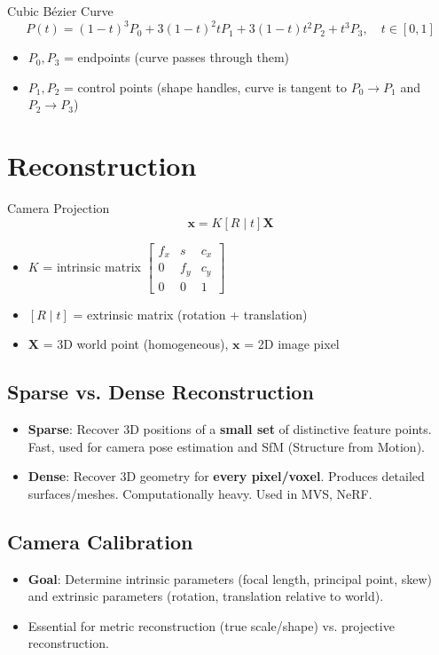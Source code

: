 \documentclass[11pt]{article}
\begin{document}
\begin{formulabox}{Cubic Bézier Curve}
$$P(t) = (1-t)^3 P_0 + 3(1-t)^2 t P_1 + 3(1-t) t^2 P_2 + t^3 P_3, \quad t \in [0, 1]$$
\begin{itemize}
    \item $P_0, P_3$ = endpoints (curve passes through them)
    \item $P_1, P_2$ = control points (shape handles, curve is tangent to $P_0 \rightarrow P_1$ and $P_2 \rightarrow P_3$)
\end{itemize}
\end{formulabox}

\section{Reconstruction}
\begin{formulabox}{Camera Projection}
$$\mathbf{x} = K [R \mid t] \mathbf{X}$$
\begin{itemize}
    \item $K$ = intrinsic matrix $\begin{bmatrix} f_x & s & c_x \\ 0 & f_y & c_y \\ 0 & 0 & 1 \end{bmatrix}$
    \item $[R \mid t]$ = extrinsic matrix (rotation + translation)
    \item $\mathbf{X}$ = 3D world point (homogeneous), $\mathbf{x}$ = 2D image pixel
\end{itemize}
\end{formulabox}

\subsection{Sparse vs. Dense Reconstruction}
\begin{itemize}
    \item \textbf{Sparse}: Recover 3D positions of a \textbf{small set} of distinctive feature points. Fast, used for camera pose estimation and SfM (Structure from Motion).
    \item \textbf{Dense}: Recover 3D geometry for \textbf{every pixel/voxel}. Produces detailed surfaces/meshes. Computationally heavy. Used in MVS, NeRF.
\end{itemize}

\subsection{Camera Calibration}
\begin{itemize}
    \item \textbf{Goal}: Determine intrinsic parameters (focal length, principal point, skew) and extrinsic parameters (rotation, translation relative to world).
    \item Essential for metric reconstruction (true scale/shape) vs. projective reconstruction.
\end{itemize}
\end{document}
